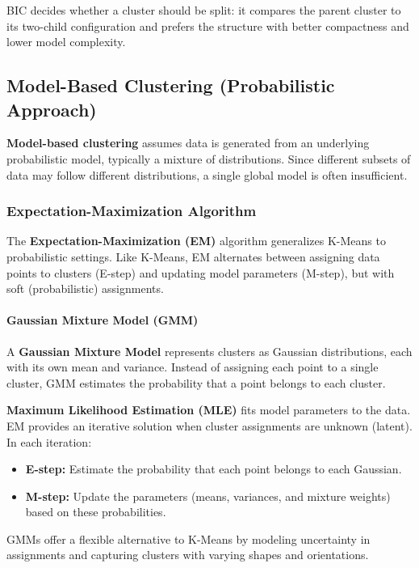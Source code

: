 BIC decides whether a cluster should be split: it compares the parent cluster to its two-child configuration and prefers the structure with better compactness and lower model complexity.

\subsection{Model-Based Clustering (Probabilistic Approach)}

\textbf{Model-based clustering} assumes data is generated from an underlying probabilistic model, typically a mixture of distributions. Since different subsets of data may follow different distributions, a single global model is often insufficient.

\subsubsection{Expectation-Maximization Algorithm}

The \textbf{Expectation-Maximization (EM)} algorithm generalizes K-Means to probabilistic settings. Like K-Means, EM alternates between assigning data points to clusters (E-step) and updating model parameters (M-step), but with soft (probabilistic) assignments.

\paragraph{Gaussian Mixture Model (GMM)}

A \textbf{Gaussian Mixture Model} represents clusters as Gaussian distributions, each with its own mean and variance. Instead of assigning each point to a single cluster, GMM estimates the probability that a point belongs to each cluster.

\textbf{Maximum Likelihood Estimation (MLE)} fits model parameters to the data. EM provides an iterative solution when cluster assignments are unknown (latent). In each iteration:
\begin{itemize}
    \item \textbf{E-step:} Estimate the probability that each point belongs to each Gaussian.
    \item \textbf{M-step:} Update the parameters (means, variances, and mixture weights) based on these probabilities.
\end{itemize}

GMMs offer a flexible alternative to K-Means by modeling uncertainty in assignments and capturing clusters with varying shapes and orientations.

